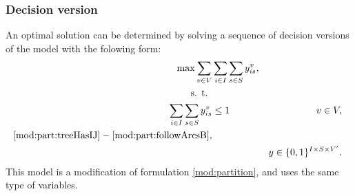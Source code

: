 \subsubsection{Decision version}

An optimal solution can be determined by solving a sequence of decision versions of the model with the folowing form:
\begin{subequations}\label{mod:genmatch}
\begin{align}
\notag \max\sum\limits_{v\in V}&\sum\limits_{i\in I}\sum\limits_{s\in S}   y_{is}^v,\\
\notag \text{s. t. } \\
\label{mod:genmatch:nodeBelongs} \sum\limits_{i\in I}\sum\limits_{s\in S}y^v_{is} & \leq 1 & v\in V,\\
\notag\eqref{mod:part:treeHasIJ} - \eqref{mod:part:followArcsB},\\
\label{mod:genmatch:dim}&&y \in \{0,1\}^{I\times S\times V'}.
\end{align}~
\end{subequations}
This model is a modification of formulation \eqref{mod:partition}, and uses the same type of variables.
